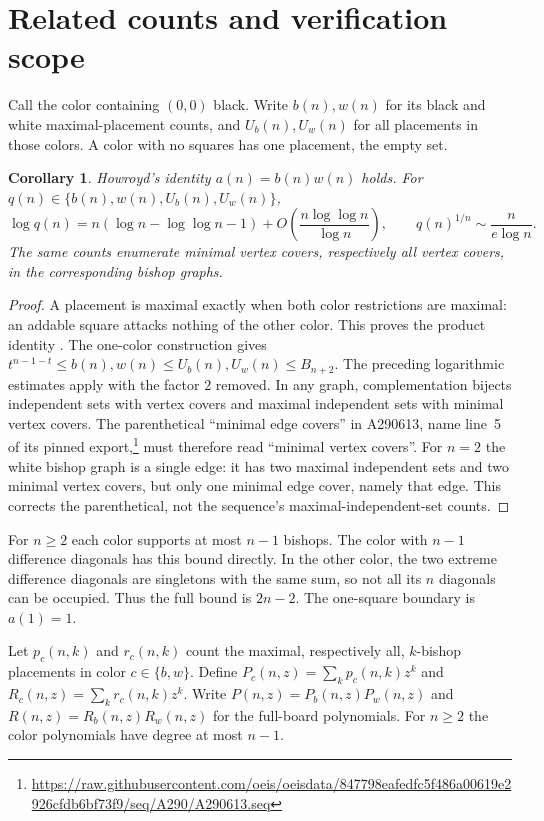 \documentclass[11pt]{article}
\newtheorem{corollary}[theorem]{Corollary}
\begin{document}
\section{Related counts and verification scope}
Call the color containing $(0,0)$ black. Write $b(n),w(n)$ for its
black and white maximal-placement counts, and $U_b(n),U_w(n)$ for all
placements in those colors. A color with no squares has one placement,
the empty set.

\begin{corollary}\label{cor:colors}
Howroyd's identity $a(n)=b(n)w(n)$ holds. For
$q(n)\in\{b(n),w(n),U_b(n),U_w(n)\}$,
\[
 \log q(n)=n(\log n-\log\log n-1)
       +O\!\left(\frac{n\log\log n}{\log n}\right),
 \qquad q(n)^{1/n}\sim\frac{n}{e\log n}.
\]
The same counts enumerate minimal vertex covers, respectively all vertex
covers, in the corresponding bishop graphs.
\end{corollary}
\begin{proof}
A placement is maximal exactly when both color restrictions are
maximal: an addable square attacks nothing of the other color. This
proves the product identity \cite{howroyd}. The one-color construction
gives $t^{n-1-t}\leq b(n),w(n)\leq U_b(n),U_w(n)\leq B_{n+2}$.
The preceding logarithmic estimates apply with the factor $2$ removed.
In any graph, complementation bijects independent sets with vertex
covers and maximal independent sets with minimal vertex covers.
The parenthetical ``minimal edge covers'' in A290613, name line~5
of its pinned export,\footnote{\url{https://raw.githubusercontent.com/oeis/oeisdata/847798eafedfc5f486a00619e2926cfdb6bf73f9/seq/A290/A290613.seq}}
must therefore read ``minimal vertex covers''.
For $n=2$ the white bishop graph is a single edge: it has two maximal
independent sets and two minimal vertex covers, but only one minimal
edge cover, namely that edge. This corrects the parenthetical, not the
sequence's maximal-independent-set counts.
\end{proof}

For $n\geq2$ each color supports at most $n-1$ bishops. The color with
$n-1$ difference diagonals has this bound directly. In the other color,
the two extreme difference diagonals are singletons with the same sum,
so not all its $n$ diagonals can be occupied. Thus the full bound is
$2n-2$. The one-square boundary is $a(1)=1$.

Let $p_c(n,k)$ and $r_c(n,k)$ count the maximal, respectively all,
$k$-bishop placements in color $c\in\{b,w\}$. Define
$P_c(n,z)=\sum_k p_c(n,k)z^k$ and
$R_c(n,z)=\sum_k r_c(n,k)z^k$.
Write $P(n,z)=P_b(n,z)P_w(n,z)$ and
$R(n,z)=R_b(n,z)R_w(n,z)$ for the full-board polynomials.
For $n\geq2$ the color polynomials have degree at most $n-1$.
\end{document}
